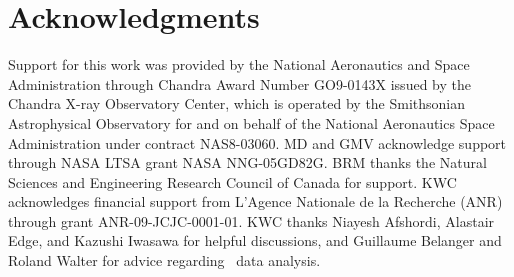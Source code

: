 \documentclass[useAMS,usenatbib]{mn2e}
\begin{document}
\section*{Acknowledgments}

Support for this work was provided by the National Aeronautics and
Space Administration through Chandra Award Number GO9-0143X issued by
the Chandra X-ray Observatory Center, which is operated by the
Smithsonian Astrophysical Observatory for and on behalf of the
National Aeronautics Space Administration under contract
NAS8-03060. MD and GMV acknowledge support through NASA LTSA grant
NASA NNG-05GD82G. BRM thanks the Natural Sciences and Engineering
Research Council of Canada for support. KWC acknowledges financial
support from L'Agence Nationale de la Recherche (ANR) through grant
ANR-09-JCJC-0001-01. KWC thanks Niayesh Afshordi, Alastair Edge, and
Kazushi Iwasawa for helpful discussions, and Guillaume Belanger and
Roland Walter for advice regarding \integral\ data analysis.






\clearpage
\onecolumn







\label{lastpage}
\end{document}
